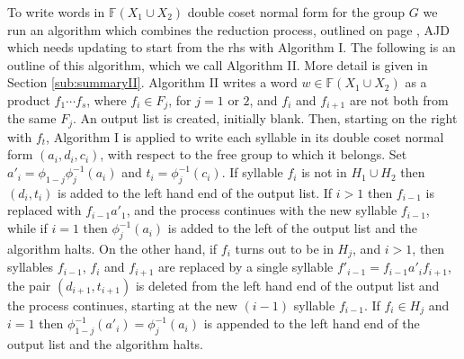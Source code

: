 \documentclass[a4paper,12pt]{article}
\numberwithin{equation}{section}
\numberwithin{figure}{section}
\newcommand{\FF}{\ensuremath{\mathbb{F}}}
\newenvironment{ajd1}{\noindent\color{red} AJD }{}
\newcommand{\ajd}[1]{\begin{ajd1} #1 \end{ajd1}}
\begin{document}
To write words in $\FF(X_1\cup X_2)$   double coset normal form  for
 the group $G$  we run 
an algorithm which combines
the reduction process, outlined on page \pageref{it:st1}, 
\ajd{which needs updating to start from the rhs } with Algorithm I. 
The following is an outline of this algorithm, which we call 
Algorithm II. More detail is   given in 
 Section 
\ref{sub:summaryII}.
 Algorithm II  writes a word $w\in \FF(X_1\cup X_2)$ as a product
$f_1\cdots f_s$, where $f_i\in F_j$, for $j=1$ or $2$, and $f_i$ and $f_{i+1}$ are not
both from the same $F_j$. An output list is created, initially blank. 
Then, starting on the right with $f_t$, Algorithm
I is applied to write each syllable in its double coset normal form 
 $(a_i, d_i, c_i)$, with respect to the 
 free group to which it belongs. Set 
$a'_i= \phi_{1-j}\phi_j^{-1}(a_i)$ and $t_i=\phi_j^{-1}(c_i)$. 
 If syllable 
$f_i$ is not in $H_1\cup H_2$ then $(d_i,t_i)$ 
is added to the left hand end 
of the output list. If $i>1$ then $f_{i-1}$ is replaced with 
$f_{i-1}a'_1$,   
and the process continues with the new syllable $f_{i-1}$, while
if $i=1$ then $\phi_j^{-1}(a_i)$ is added to the left of the output list and 
the algorithm halts.  On the other hand,  
if $f_i$ turns out to be
in $H_j$, and $i>1$, then syllables $f_{i-1}$, $f_i$ 
and $f_{i+1}$  are replaced by a single syllable 
$f'_{i-1}=f_{i-1}a'_i f_{i+1}$, the pair $(d_{i+1},t_{i+1})$ 
is deleted from the left hand end of the output list
and the process continues, starting at the new  $(i-1)$ syllable $f_{i-1}$.
If $f_i\in H_j$ and  
$i=1$ then $\phi_{1-j}^{-1}(a'_i)=\phi_j^{-1}(a_i)$ 
is appended  to the left hand end of the output list and 
the algorithm halts.
\end{document}
